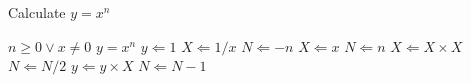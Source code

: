 \documentclass{article}
\begin{document}
\lipsum[1]
\begin{algorithm}
\caption{Calculate $y = x^n$}
\label{alg1}
\begin{multicols}{2}
\begin{algorithmic}[1]
  \REQUIRE $n \geq 0 \vee x \neq 0$
  \ENSURE $y = x^n$
  \STATE $y \Leftarrow 1$
  \STATE $X \Leftarrow 1 / x$
  \STATE $N \Leftarrow -n$
  \ELSE
  \STATE $X \Leftarrow x$
  \STATE $N \Leftarrow n$
  \ENDIF
  \STATE $X \Leftarrow X \times X$
  \STATE $N \Leftarrow N / 2$
  \ELSE[$N$ is odd]
  \STATE $y \Leftarrow y \times X$
  \STATE $N \Leftarrow N - 1$
  \ENDIF
  \ENDWHILE
\end{algorithmic}
\end{multicols}
\end{algorithm}
\lipsum[2]
\end{document}
